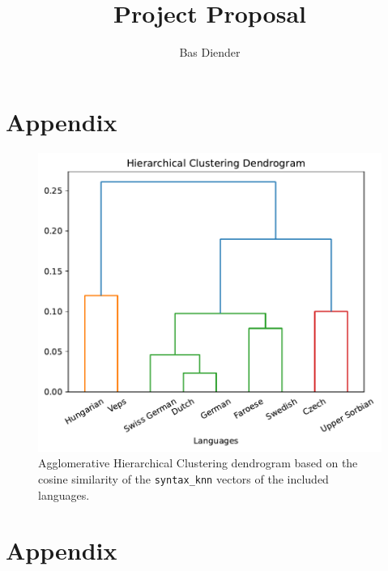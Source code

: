 \documentclass[runningheads]{template/llncs}
\begin{document}
%

\title{Project Proposal}
%
%
\author{Bas Diender}
%
%
%
\maketitle









\newpage

\appendix
\section{Appendix}
\label{app:a}
\begin{figure}
	\centering
	\label{fig:hcd}
		\includegraphics[width=0.60\linewidth]{figures/hcd.pdf}
		\caption{Agglomerative Hierarchical Clustering dendrogram based on the cosine similarity of the \texttt{syntax\_knn} vectors of the included languages.}
\end{figure}

\section{Appendix}
\label{app:b}
\end{document}
